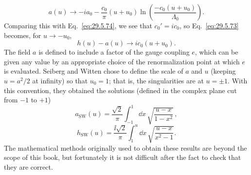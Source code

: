 \begin{equation}
  a(u)\longrightarrow-ia_0-\frac{c_0}{\pi}(u+u_0)
  \ln\left(\frac{-c_0(u+u_0)}{\Lambda_0}\right).
  \tag{29.5.75}\label{eq:29.5.75}
\end{equation}
Comparing this with Eq.~\eqref{eq:29.5.74}, we see that
\(c_0'=ic_0\), so Eq.~\eqref{eq:29.5.73} becomes, for
\(u\longrightarrow-u_0\),
\begin{equation}
  h(u)-a(u)\longrightarrow ic_0(u+u_0).
  \tag{29.5.76}\label{eq:29.5.76}
\end{equation}
The field \(a\) is defined to include a factor of the gauge coupling \(e\),
which can be given any value by an appropriate choice of the renormalization
point at which \(e\) is evaluated. Seiberg and Witten chose to define the
scale of \(a\) and \(u\) (keeping \(u=a^2/2\) at infinity) so that \(u_0=1\);
that is, the singularities are at \(u=\pm1\). With this convention, they
obtained the solutions (defined in the complex plane cut from \(-1\) to
\(+1\))
\begin{equation}
  a_{\mathrm{SW}}(u)
  =\frac{\sqrt{2}}{\pi}\int_{-1}^{1}\dd x\,
    \sqrt{\frac{u-x}{1-x^2}}\,,
  \tag{29.5.77}\label{eq:29.5.77}
\end{equation}
\begin{equation}
  h_{\mathrm{SW}}(u)
  =\frac{\ii\sqrt{2}}{\pi}\int_1^u \dd x\,
    \sqrt{\frac{u-x}{x^2-1}}.
  \tag{29.5.78}\label{eq:29.5.78}
\end{equation}
The mathematical methods originally used to obtain these results are beyond
the scope of this book, but fortunately it is not difficult after the fact
to check that they are correct.

